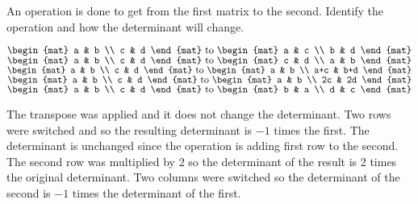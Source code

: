 
\begin{Exercise}[
name={},
title={}, 
difficulty=0,
origin={\cite{KK}}]
An operation is done to get from the first matrix to the second.
Identify the operation and how the determinant will change. 
\begin{multicols}{2}
\Question $\begin{mat}
a & b \\
c & d
\end{mat}
\text{ to }
\begin{mat}
a & c \\
b & d
\end{mat}$
\Question $\begin{mat}
a & b \\
c & d
\end{mat}
\text{ to }
\begin{mat}
c & d \\
a & b
\end{mat}$
\Question  $\begin{mat}
a & b \\
c & d
\end{mat}
\text{ to }
\begin{mat}
a & b \\
a+c & b+d
\end{mat}$
\Question  $\begin{mat}
a & b \\
c & d
\end{mat}
\text{ to }
\begin{mat}
a & b \\
2c & 2d
\end{mat}$
\Question  $\begin{mat}
a & b \\
c & d
\end{mat}
\text{ to }
\begin{mat}
b & a \\
d & c
\end{mat}$
\EndCurrentQuestion
\end{multicols}
\end{Exercise}

\begin{Answer}
\Question The transpose was applied and it does not change the determinant. 
\Question Two rows were switched and so the resulting determinant is $-1$
times the first.
\Question The determinant is unchanged since the operation is adding first row to the second.
\Question The second row was multiplied by 2 so the determinant of the result is 2
times the original determinant.
\Question Two columns were switched so the determinant of the second
is $-1$ times the determinant of the first.
\end{Answer}
